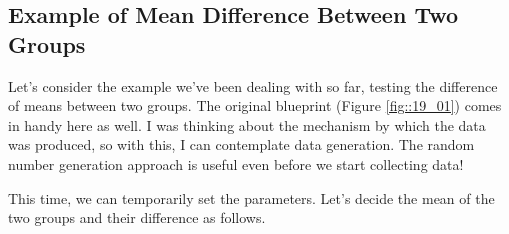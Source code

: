 \documentclass{ltjsbook}
\begin{document}
\subsection{Example of Mean Difference Between Two Groups}
Let's consider the example we've been dealing with so far, testing the difference of means between two groups.
The original blueprint (Figure \ref{fig::19_01}) comes in handy here as well.
I was thinking about the mechanism by which the data was produced, so with this, I can contemplate data generation. The random number generation approach is useful even before we start collecting data!

This time, we can temporarily set the parameters. Let's decide the mean of the two groups and their difference as follows.

\end{document}
